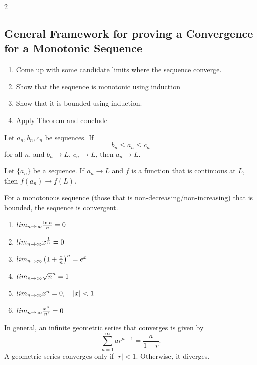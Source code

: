 \documentclass[5pt, a4paper]{article}
\begin{document}
\begin{multicols}{2}
    \subsection*{General Framework for proving a Convergence for a Monotonic
    Sequence}
    \begin{enumerate}
        \item Come up with some candidate limits where the sequence converge.
        \item Show that the sequence is monotonic using induction
        \item Show that it is bounded using induction.
        \item Apply Theorem and conclude
    \end{enumerate}
    \begin{tcolorbox}[title=Squeeze Theorem]
        Let $a_n,b_n,c_n$ be sequences. If  \[
        b_n \le  a_n \le c_n
        \] 
        for all $n$, and $b_n \to L$, $c_n \to L$, then $a_n \to L$.
    \end{tcolorbox}
    \begin{tcolorbox}[title=Continuous Function Theorem for Sequences]
        Let $\{a_n\}$ be a sequence. If $a_n \to L$ and $f$ is a function that
        is continuous at $L$, then $f(a_n) \to f(L)$.
    \end{tcolorbox}
    \begin{tcolorbox}[title=Monotone Convergence Theorem]
       For a monotonous sequence (those that is non-decreasing/non-increasing)
       that is bounded, the sequence is convergent.
   \end{tcolorbox} 
   \begin{tcolorbox}[title=Commonly Found Limits]
       \begin{enumerate}
           \item $
           lim_{n \to \infty} \frac{\ln n}{n} = 0 \\
           $
        \item $
            lim_{n \to \infty} x^{\frac{1}{n}} = 0 \\
            $
        \item$ 
            lim_{n \to \infty} \left( 1 + \frac{x}{n} \right)^n  = e^x \\
            $
        \item $ 
            lim_{n \to \infty} \sqrt{n}^n  = 1 \\
            $
        \item $ 
            lim_{n \to \infty} x^n  = 0, \quad |x| < 1 \\
            $
        \item $
            lim_{n \to \infty} \frac{x^n}{n!}  = 0 \\
            $
       \end{enumerate}
   \end{tcolorbox}
   \begin{tcolorbox}[title=Geometric Series]
       In general, an infinite geometric series that converges is given by \[
           \sum_{n=1}^{\infty} ar^{n-1} = \frac{a}{1-r}
       .\] 
       A geometric series converges only if $|r| < 1$. Otherwise, it diverges.
   \end{tcolorbox}


\end{multicols}
\end{document}
